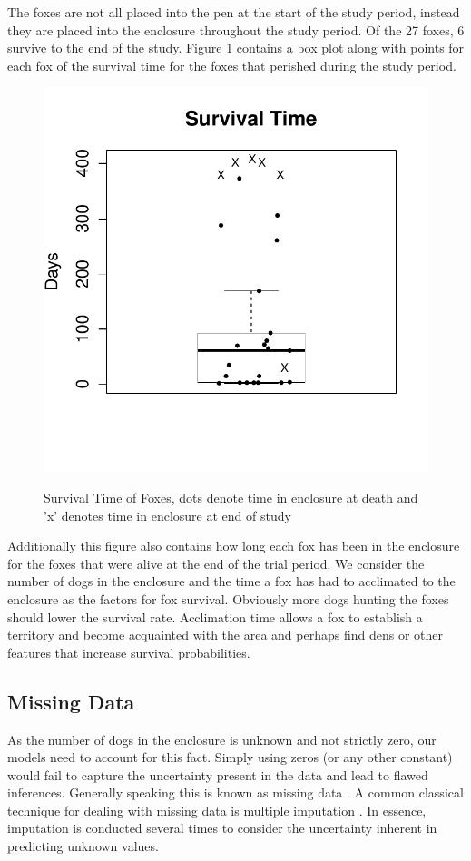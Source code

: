 \documentclass[aoas,preprint]{imsart}
\numberwithin{equation}{section}
\theoremstyle{plain}
\begin{document}
The foxes are not all placed into the pen at the start of the study period, instead they are placed into the enclosure throughout the study period. Of the 27 foxes, 6 survive to the end of the study. Figure \ref{fig:SurvTime} contains a box plot along with points for each fox of the survival time for the foxes that perished during the study period. 
\begin{figure}[h!]
\begin{center}
\caption{Survival Time of Foxes, dots denote time in enclosure at death and 'x' denotes time in enclosure at end of study}
\includegraphics[width=.7\textwidth]{Survival_Time.pdf}
\label{fig:SurvTime}
\end{center}
\end{figure}
Additionally this figure also contains how long each fox has been in the enclosure for the foxes that were alive at the end of the trial period. We consider the number of dogs in the enclosure and the time a fox has had to acclimated to the enclosure as the factors for fox survival. Obviously more dogs hunting the foxes should lower the survival rate. Acclimation time allows a fox to establish a territory and become acquainted with the area and perhaps find dens or other features that increase survival probabilities.

\subsection{Missing Data}
As the number of dogs in the enclosure is unknown and not strictly zero, our models need to account for this fact. Simply using zeros (or any other constant) would fail to capture the uncertainty present in the data and lead to flawed inferences. Generally speaking this is known as missing data \citep{little}. A common classical technique for dealing with missing data is multiple imputation \citep{rubin}. In essence, imputation is conducted several times to consider the uncertainty inherent in predicting unknown values.
\end{document}
